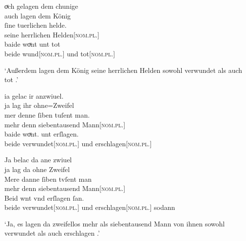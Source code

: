\begin{exe}
\ex \label{ex:konjadjvvbeide}
    \begin{xlist}
	\ex \label{ex:konjadjvvbeide_1} %
		\gll oͮch gelagen dem chunige \\
			auch lagen dem König \\
	\sn \gll ſine tuerlichen helde. \\
			seine herrlichen Helden[\textsc{nom.pl.\MascM}] \\
	\sn \gll baide woͮnt unt tot \\
			beide wund[\textsc{nom.pl.\MascM}] und tot[\textsc{nom.pl.\MascM}] \\
		\begin{taggedline}{\parencites[\pno~67vb,35--36]{kc:A1}[vgl.][15880--15882]{schroeder1895}}
			\trans `Außerdem lagen dem König seine herrlichen Helden
				sowohl verwundet als auch tot .'
		\end{taggedline}
	
	\ex \label{ex:konjadjvvbeide_2} %
		\begin{taggedline}{\parencites[\pno~72ra,32--34]{kc:A1}[vgl.][16891--16893]{schroeder1895}}
		\gll ia gelac ir anzwiuel. \\
			ja lag ihr ohne=Zweifel \\
	\sn \gll mer denne {ſiben tuſent} man. \\
			mehr denn siebentausend Mann[\textsc{nom.pl.\MascM}] \\
	\sn \gll baide woͮnt. unt erſlagen. \\
			beide verwundet[\textsc{nom.pl.\MascM}] und erschlagen[\textsc{nom.pl.\MascM}] \\
		\end{taggedline}
	
	\ex \label{ex:konjadjvvbeide_3} %
		\gll Ja belac da ane zwiuel \\
			ja lag da ohne Zweifel \\
	\sn \gll Mere danne {ſiben tvſent} man \\
			mehr denn siebentausend Mann[\textsc{nom.pl.\MascM}] \\
	\sn \gll Beid wnt vnd erſlagen ſan. \\
			beide verwundet[\textsc{nom.pl.\MascM}] und erschlagen[\textsc{nom.pl.\MascM}]
			sodann \\
		\begin{taggedline}{\parencites[\pno~110va,9--11]{kc:VB}[vgl.][16891--16893]{schroeder1895}}
		\trans `Ja, es lagen da zweifellos mehr als siebentausend Mann
			von ihnen sowohl verwundet als auch erschlagen .'
		\end{taggedline}


\end{xlist}
\end{exe}

